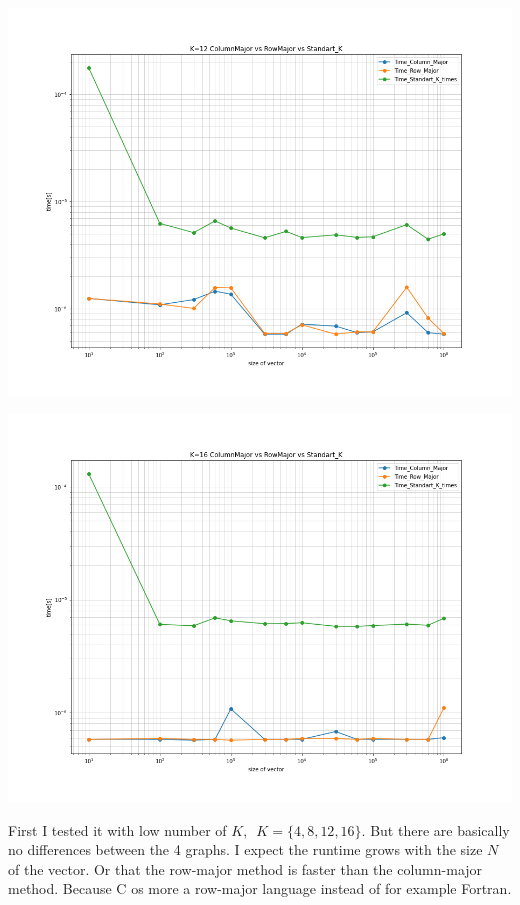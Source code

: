 \documentclass[11pt,a4paper]{article}
\begin{document}
\begin{center}
	
	\begin{minipage}[t]{0.49\textwidth}
		\includegraphics[width=\textwidth]{Bilder/K=12_ColumnMajor_vs_RowMajor_vs_Standart_K.png}
	\end{minipage}
	\begin{minipage}[t]{0.49\textwidth}
		\includegraphics[width=\textwidth]{Bilder/K=16_ColumnMajor_vs_RowMajor_vs_Standart_K.png}
	\end{minipage}
	
\end{center}
First I tested it with low number of $K, \,\,\, K = \{4,8,12,16\}$. But there are basically no differences between the 4 graphs. I expect the runtime grows with the size $N$ of the vector. Or that the row-major method is faster than the column-major method. Because C os more a row-major language instead of for example Fortran.
\end{document}

